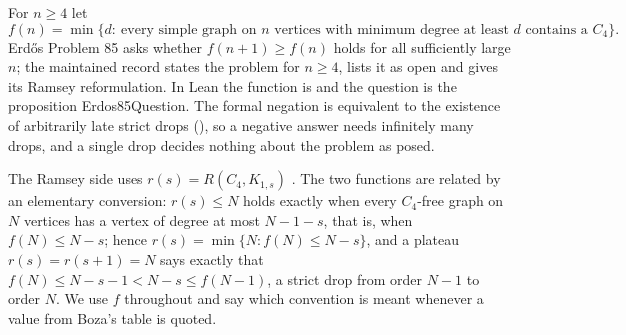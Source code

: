 \documentclass{anvil-paper}
\newcommand{\Qn}{\textsf{Erdos85Question}}
\theoremstyle{definition}
\begin{document}
For $n\ge 4$ let
\[
f(n)=\min\{d:\ \text{every simple graph on $n$ vertices with minimum degree at least $d$ contains a }C_4\}.
\]
Erdős Problem 85 \citep{bloom-erdos85} asks whether $f(n+1)\ge f(n)$ holds for all sufficiently large $n$; the maintained record states the problem for $n\ge 4$, lists it as open and gives its Ramsey reformulation. In Lean the function is  and the question is the proposition \Qn. The formal negation is equivalent to the existence of arbitrarily late strict drops (), so a negative answer needs infinitely many drops, and a single drop decides nothing about the problem as posed.

The Ramsey side uses $r(s)=R(C_4,K_{1,s})$ \citep{boza2024ramsey,zhang2017polarity}. The two functions are related by an elementary conversion: $r(s)\le N$ holds exactly when every $C_4$-free graph on $N$ vertices has a vertex of degree at most $N-1-s$, that is, when $f(N)\le N-s$; hence $r(s)=\min\{N: f(N)\le N-s\}$, and a plateau $r(s)=r(s+1)=N$ says exactly that $f(N)\le N-s-1<N-s\le f(N-1)$, a strict drop from order $N-1$ to order $N$. We use $f$ throughout and say which convention is meant whenever a value from Boza's table is quoted.
\end{document}
